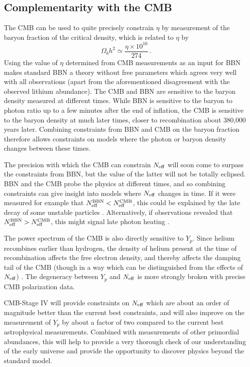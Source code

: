 \subsection{Complementarity with the CMB}\label{Complementarity}
The CMB can be used to quite precisely constrain $\eta$ by measurement of the baryon fraction of the critical density, which is related to $\eta$ by
\begin{equation}
	\Omega_b h^2 \simeq \frac{\eta\times10^{10}}{274} \, .
\end{equation}
Using the value of $\eta$ determined from CMB measurements as an input for BBN makes standard BBN a theory without free parameters which agrees very well with all observations (apart from the aforementioned disagreement with the observed lithium abundance).  The CMB and BBN are sensitive to the baryon density measured at different times.  While BBN is sensitive to the baryon to photon ratio up to a few minutes after the end of inflation, the CMB is sensitive to the baryon density at much later times, closer to recombination about 380,000 years later.  Combining constraints from BBN and CMB on the baryon fraction therefore allows constraints on models where the photon or baryon density changes between these times.

The precision with which the CMB can constrain $N_{\rm eff}$ will soon come to surpass the constraints from BBN, but the value of the latter will not be totally eclipsed.  BBN and the CMB probe the physics at different times, and so combining constraints can give insight into models where $N_{\rm eff}$ changes in time.  If it were measured for example that $N_{\rm eff}^{\mathrm{BBN}}<N_{\rm eff}^{\mathrm{CMB}}$, this could be explained by the late decay of some unstable particles \cite{Fischler:2010xz,Menestrina:2011mz,Hooper:2011aj}.  Alternatively, if observations revealed that $N_{\rm eff}^{\mathrm{BBN}}>N_{\rm eff}^{\mathrm{CMB}}$, this might signal late photon heating \cite{Cadamuro:2010cz,Millea:2015qra}.

The power spectrum of the CMB is also directly sensitive to $Y_p$.  Since helium recombines earlier than hydrogen, the density of helium present at the time of recombination affects the free electron density, and thereby affects the damping tail of the CMB (though in a way which can be distinguished from the effects of $N_{\rm eff}$) \cite{Bashinsky:2003tk,Hou:2011ec,Follin:2015hya,Baumann:2015rya}.  The degeneracy between $Y_p$ and $N_{\rm eff}$ is more strongly broken with precise CMB polarization data.

CMB-Stage IV will provide constraints on $N_{\rm eff}$ which are about an order of magnitude better than the current best constraints, and will also improve on the measurement of $Y_p$ by about a factor of two compared to the current best astrophysical measurements.  Combined with measurements of other primordial abundances, this will help to provide a very thorough check of our understanding of the early universe and provide the opportunity to discover physics beyond the standard model.









